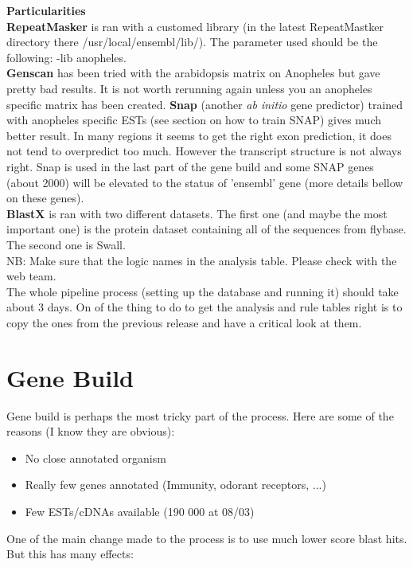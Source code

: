 \documentclass[a4paper,10pt]{article}
\begin{document}
\textbf{Particularities}\\
\textbf{RepeatMasker} is ran with a customed library (in the latest RepeatMastker directory there /usr/local/ensembl/lib/). The parameter used should be the following: \--lib anopheles.\\
\textbf{Genscan} has been tried with the arabidopsis matrix on Anopheles but gave pretty bad results. It is not worth rerunning again unless you an anopheles specific matrix has been created.
\textbf{Snap} (another \textit{ab initio} gene predictor) trained with anopheles specific ESTs (see section on how to train SNAP) gives much better result. In many regions it seems to get the right exon prediction, it does not tend to overpredict too much. However the transcript structure is not always right. Snap is used in the last part of the gene build and some SNAP genes (about 2000) will be elevated to the status of 'ensembl' gene (more details bellow on these genes).\\
\textbf{BlastX} is ran with two different datasets. The first one (and maybe the most important one) is the protein dataset containing all of the sequences from flybase. The second one is Swall.\\

NB: Make sure that the logic names in the analysis table. Please check with the web team.\\
The whole pipeline process (setting up the database and running it) should take about 3 days. On of the thing to do to get the analysis and rule tables right is to copy the ones from the previous release and have a critical look at them.

\section{Gene Build}
Gene build is perhaps the most tricky part of the process. Here are some of the reasons (I know they are obvious):
\begin{itemize}
\item No close annotated organism
\item Really few genes annotated (Immunity, odorant receptors, ...)
\item Few ESTs/cDNAs available (190 000 at 08/03)
\end{itemize}
One of the main change made to the process is to use much lower score blast hits. But this has many effects:
\end{document}
